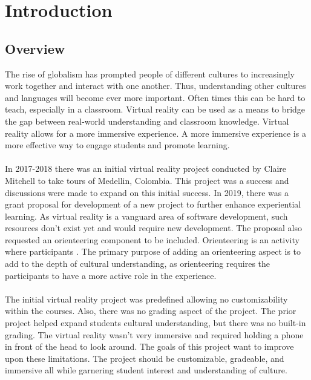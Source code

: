 \section{Introduction}
\label{sec:Introduction}

\subsection{Overview} 
The rise of globalism has prompted people of different cultures to increasingly work together and interact with one another. Thus, understanding other cultures and languages will become ever more important. Often times this can be hard to teach, especially in a classroom. Virtual reality can be used as a means to bridge the gap between real-world understanding and classroom knowledge. Virtual reality allows for a more immersive experience. A more immersive experience is a more effective way to engage students and promote learning. \\
\\
In 2017-2018 there was an initial virtual reality project conducted by Claire Mitchell to take tours of Medellin, Colombia. This project was a success and discussions were made to expand on this initial success. In 2019, there was a grant proposal for development of a new project to further enhance experiential learning. As virtual reality is a vanguard area of software development, such resources don't exist yet and would require new development. The proposal also requested an orienteering component to be included. Orienteering is an activity where participants . The primary purpose of adding an orienteering aspect is to add to the depth of cultural understanding, as orienteering requires the participants to have a more active role in the experience. \\
\\
The initial virtual reality project was predefined allowing no customizability within the courses. Also, there was no grading aspect of the project. The prior project helped expand students cultural understanding, but there was no built-in grading. The virtual reality wasn't very immersive and required holding a phone in front of the head to look around. The goals of this project want to improve upon these limitations. The project should be customizable, gradeable, and immersive all while garnering student interest and understanding of culture.  \\
\\ 

